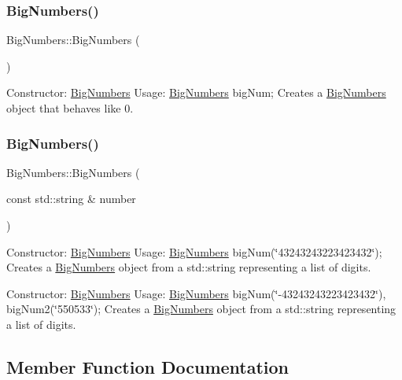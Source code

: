 \subsubsection{\texorpdfstring{Big\+Numbers()}{BigNumbers()}\hspace{0.1cm}{\footnotesize\ttfamily [1/2]}}
{\footnotesize\ttfamily Big\+Numbers\+::\+Big\+Numbers (\begin{DoxyParamCaption}{ }\end{DoxyParamCaption})}

Constructor\+: \mbox{\hyperlink{class_big_numbers}{Big\+Numbers}} Usage\+: \mbox{\hyperlink{class_big_numbers}{Big\+Numbers}} big\+Num; Creates a \mbox{\hyperlink{class_big_numbers}{Big\+Numbers}} object that behaves like 0. \mbox{\label{class_big_numbers_a7aca99911efb6981ac70f1514e8f2a5e}} 
\subsubsection{\texorpdfstring{Big\+Numbers()}{BigNumbers()}\hspace{0.1cm}{\footnotesize\ttfamily [2/2]}}
{\footnotesize\ttfamily Big\+Numbers\+::\+Big\+Numbers (\begin{DoxyParamCaption}\item[{const std\+::string \&}]{number }\end{DoxyParamCaption})}

Constructor\+: \mbox{\hyperlink{class_big_numbers}{Big\+Numbers}} Usage\+: \mbox{\hyperlink{class_big_numbers}{Big\+Numbers}} big\+Num(\char`\"{}43243243223423432\char`\"{}); Creates a \mbox{\hyperlink{class_big_numbers}{Big\+Numbers}} object from a std\+::string representing a list of digits.

Constructor\+: \mbox{\hyperlink{class_big_numbers}{Big\+Numbers}} Usage\+: \mbox{\hyperlink{class_big_numbers}{Big\+Numbers}} big\+Num(\char`\"{}-\/43243243223423432\char`\"{}), big\+Num2(\char`\"{}550533\char`\"{}); Creates a \mbox{\hyperlink{class_big_numbers}{Big\+Numbers}} object from a std\+::string representing a list of digits. 

\subsection{Member Function Documentation}
\mbox{\label{class_big_numbers_af879df797b67fcbe442746d0532529ab}} 

